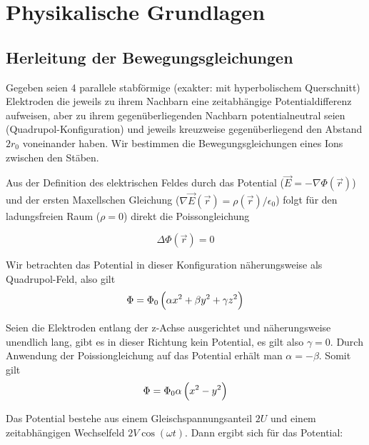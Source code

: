 \documentclass[a4paper,german,12pt,smallheadings]{scrartcl}
\begin{document}
\begin{titlepage}

\end{titlepage}

\allowdisplaybreaks %

\section{Physikalische Grundlagen}
\subsection{Herleitung der Bewegungsgleichungen}

Gegeben seien 4 parallele stabförmige (exakter: mit hyperbolischem Querschnitt) Elektroden die jeweils zu ihrem Nachbarn
eine zeitabhängige Potentialdifferenz aufweisen, aber zu ihrem
gegenüberliegenden Nachbarn potentialneutral seien (Quadrupol-Konfiguration)
und jeweils kreuzweise gegenüberliegend den Abstand $2r_0$ voneinander haben.
Wir bestimmen die Bewegungsgleichungen eines Ions zwischen den Stäben.

Aus der Definition des elektrischen Feldes durch das Potential
($\vec{E} = - \nabla \Phi(\vec{r})$) und der ersten Maxellschen Gleichung
($\nabla \vec{E}(\vec{r}) = \rho(\vec{r}) / \epsilon_0$) folgt für den ladungsfreien
Raum ($\rho = 0$) direkt die Poissongleichung

\begin{equation}
  \Delta \Phi(\vec{r}) = 0
\end{equation}

Wir betrachten das Potential in dieser Konfiguration näherungsweise als
Quadrupol-Feld, also gilt
\begin{equation}
  \Phi = \Phi_0 \del{\alpha x^2 + \beta y^2 + \gamma z^2}
\end{equation}

Seien die Elektroden entlang der z-Achse ausgerichtet und näherungsweise
unendlich lang, gibt es in dieser Richtung kein Potential, es gilt also $\gamma
= 0$. Durch Anwendung der Poissiongleichung auf das Potential erhält man
$\alpha = -\beta$. Somit gilt
\begin{equation}
  \Phi = \Phi_0 \alpha \del{x^2 - y^2}
\end{equation}

Das Potential bestehe aus einem Gleischspannungsanteil $2U$ und einem
zeitabhängigen Wechselfeld $2V \cos(\omega t)$. Dann ergibt sich für das
Potential:
\end{document}
